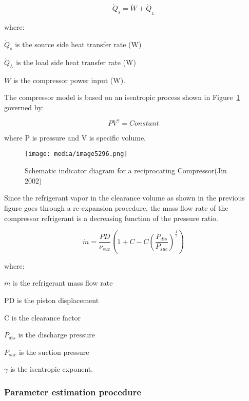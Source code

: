 \begin{equation}
{\dot Q_s} = \dot W + {\dot Q_{_L}}
\end{equation}

where:

\({\dot Q_s}\) is the source side heat transfer rate (W)

\({\dot Q_L}\) is the load side heat transfer rate (W)

\(\dot W\) is the compressor power input (W).

The compressor model is based on an isentropic process shown in Figure~\ref{fig:schematic-indicator-diagram-for-a} governed by:

\begin{equation}
{PV^{\gamma}} = Constant
\end{equation}

where P is pressure and V is specific volume.

\begin{figure}[hbtp] %
\centering
\texttt{[image: media/image5296.png]}
\caption{Schematic indicator diagram for a reciprocating Compressor(Jin 2002) \protect \label{fig:schematic-indicator-diagram-for-a}}
\end{figure}

Since the refrigerant vapor in the clearance volume as shown in the previous figure goes through a re-expansion procedure, the mass flow rate of the compressor refrigerant is a decreasing function of the pressure ratio.

\begin{equation}
{\dot{m}} = \frac{{PD}}{{\nu {}_{suc}}}\left( 1 + C - C{(\frac{{P{}_{dis}}}{{P{}_{suc}}})^{\frac{1}{\gamma }}} \right)
\end{equation}

where:

\({\dot{m}}\) is the refrigerant mass flow rate

PD is the piston displacement

C is the clearance factor

\(P_{dis}\) is the discharge pressure

\(P_{suc}\) is the suction pressure

\(\gamma\) is the isentropic exponent.

\subsubsection{Parameter estimation procedure}\label{parameter-estimation-procedure}

